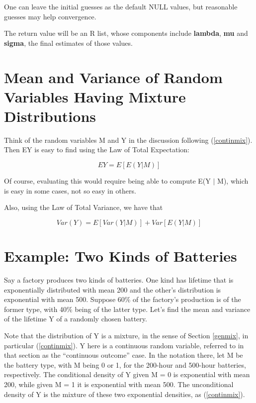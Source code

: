 \documentclass[11pt]{article}
\begin{document}
One can leave the initial guesses as the default NULL values, but
reasonable guesses may help convergence.

The return value will be an R list, whose components include {\bf
lambda}, {\bf mu} and {\bf sigma}, the final estimates of those values.

\section{Mean and Variance of Random Variables Having Mixture
Distributions}
\label{mixmeanvar}

Think of the random variables M and Y in the discussion following
(\ref{continmix}).  Then EY is easy to find using the Law of Total
Expectation:

\begin{equation}
\label{mixmean}
EY = E[E(Y | M)]
\end{equation}

Of course, evaluating this would require being able to compute E(Y $|$
M), which is easy in some cases, not so easy in others.

Also, using the Law of Total Variance, we have that

\begin{equation}
\label{mixvar}
Var(Y) = E[Var(Y|M)] + Var[E(Y|M)]
\end{equation}

\section{Example:  Two Kinds of Batteries}

Say a factory produces two kinds of batteries.  One kind has lifetime
that is exponentially distributed with mean 200 and the other's
distribution is exponential with mean 500.  Suppose 60\% of the
factory's production is of the former type, with 40\% being of the
latter type.  Let's find the mean and variance of the lifetime Y of a
randomly chosen battery.

Note that the distribution of Y is a mixture, in the sense of Section
\ref{genmix}, in particular (\ref{continmix}).  Y here is a continuous
random variable, referred to in that section as the ``continuous
outcome'' case.   In the notation there, let M be the battery type, with
M being 0 or 1, for the 200-hour and 500-hour batteries, respectively.
The conditional density of Y given M = 0 is exponential with mean 200,
while given M = 1 it is exponential with mean 500.  The unconditional
density of Y is the mixture of these two exponential densities, as 
(\ref{continmix}).
\end{document}
